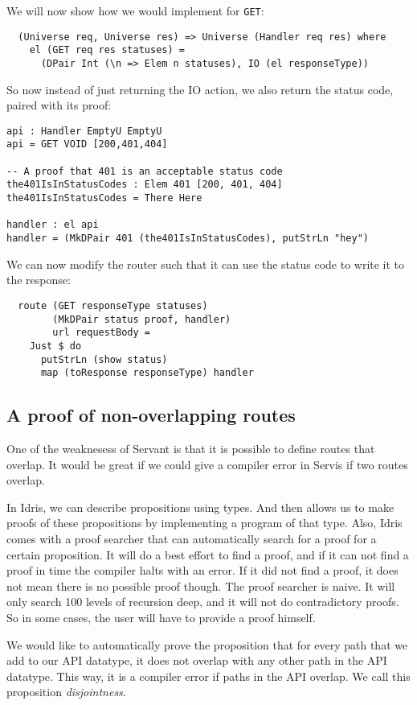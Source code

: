 \documentclass[12pt,a4paper]{article}
\begin{document}
We will now show how we would implement for \texttt{GET}:
\begin{verbatim}
  (Universe req, Universe res) => Universe (Handler req res) where
    el (GET req res statuses) =
      (DPair Int (\n => Elem n statuses), IO (el responseType))
\end{verbatim}
So now instead of just returning the IO action, we also return the status code, paired with its proof:
\begin{verbatim}
api : Handler EmptyU EmptyU
api = GET VOID [200,401,404]

-- A proof that 401 is an acceptable status code
the401IsInStatusCodes : Elem 401 [200, 401, 404]
the401IsInStatusCodes = There Here

handler : el api
handler = (MkDPair 401 (the401IsInStatusCodes), putStrLn "hey")
\end{verbatim}
We can now modify the router such that it can use the status code to write it to the response:
\begin{verbatim}
  route (GET responseType statuses)
        (MkDPair status proof, handler)
        url requestBody =
    Just $ do
      putStrLn (show status)
      map (toResponse responseType) handler
\end{verbatim}
\subsection{A proof of non-overlapping routes}
One of the weaknesess of Servant is that it is possible to define routes that overlap. It would be great if we could give a compiler error in Servis if two routes overlap.

In Idris, we can describe propositions using types. And then allows us to make proofs of these propositions by implementing a program of that type.  Also, Idris comes with a proof searcher that can automatically search for a proof for a certain proposition. It will do a best effort to find a proof, and if it can not find a proof in time the compiler halts with an error. If it did not find a proof, it does not mean there is no possible proof though. The proof searcher is naive. It will only search 100 levels of recursion deep, and it will not do contradictory proofs. So in some cases, the user will have to provide a proof himself. 

We would like to automatically prove the proposition that for every path that we add to our API datatype, it does not overlap with any other path in the API datatype. This way, it is a compiler error if paths in the API overlap. We call this proposition \emph{disjointness}.
\end{document}
